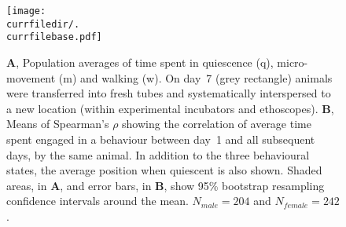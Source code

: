 \begin{figure}[h!]
	\centering   
	\texttt{[image: \\currfiledir/.\\currfilebase.pdf]}
	  \caption[Individual consistency of behavioural states]{
	\textbf{A}, Population averages of time spent in quiescence (q), micro-movement (m) and walking (w).
	On day~7 (grey rectangle) animals were transferred into fresh tubes and systematically interspersed to a new location (within experimental incubators and ethoscopes).
	\textbf{B}, Means of Spearman's $\rho$ showing the correlation of average time spent engaged in a behaviour between day~1 and all subsequent days, by the same animal.
	In addition to the three behavioural states, the average position when quiescent is also shown.
	Shaded areas, in \textbf{A}, and error bars, in \textbf{B}, show 95\% bootstrap resampling confidence intervals around the mean.
	$N_{male} = 204$ and $N_{female} = 242$.
	\label{fig:\currfilebase}
}
\end{figure}
